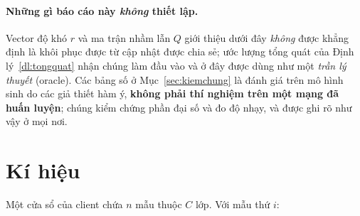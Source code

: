 \documentclass[11pt]{article}
\theoremstyle{remark}
\begin{document}
\paragraph{Những gì báo cáo này \emph{không} thiết lập.}
Vector độ khó $r$ và ma trận nhầm lẫn $Q$ giới thiệu dưới đây \emph{không}
được khẳng định là khôi phục được từ cập nhật được chia sẻ; ước lượng tổng
quát của Định lý~\ref{dl:tongquat} nhận chúng làm đầu vào và ở đây được dùng
như một \emph{trần lý thuyết} (oracle). Các bảng số ở
Mục~\ref{sec:kiemchung} là đánh giá trên mô hình sinh do các giả thiết hàm ý,
\textbf{không phải thí nghiệm trên một mạng đã huấn luyện}; chúng kiểm chứng
phần đại số và đo độ nhạy, và được ghi rõ như vậy ở mọi nơi.

\section{Kí hiệu}
\label{sec:kihieu}

Một cửa sổ của client chứa $n$ mẫu thuộc $C$ lớp. Với mẫu thứ $i$:
\end{document}
